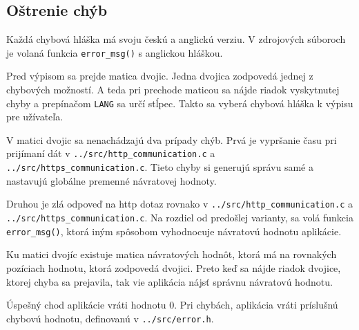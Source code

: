 \subsection*{Oštrenie chýb}
\label{err_label}
Každá chybová hláška má svoju českú a anglickú verziu. V zdrojových súboroch je volaná funkcia {\tt error\_msg()} s anglickou hláškou. 

Pred výpisom sa prejde matica dvojic. Jedna dvojica zodpovedá jednej z chybových možností. A teda pri prechode maticou sa nájde riadok vyskytnutej chyby a prepínačom {\tt LANG} sa určí stĺpec. Takto sa vyberá chybová hláška k výpisu pre užívateľa.

V matici dvojic sa nenachádzajú dva prípady chýb. Prvá je vypršanie času pri prijímaní dát v {\tt ../src/http\_communication.c} a 
\\{\tt ../src/https\_communication.c}. Tieto chyby si generujú správu samé a nastavujú globálne premenné návratovej hodnoty.

Druhou je zlá odpoveď na http dotaz rovnako v {\tt ../src/http\_communication.c} a 
\\{\tt ../src/https\_communication.c}. Na rozdiel od predošlej varianty, sa volá funkcia
\\{\tt error\_msg()}, ktorá iným spôsobom vyhodnocuje návratovú hodnotu aplikácie.

Ku matici dvojíc existuje matica návratových hodnôt, ktorá má na rovnakých pozíciach hodnotu, ktorá zodpovedá dvojici. Preto keď sa nájde riadok dvojice, ktorej chyba sa prejavila, tak vie aplikácia nájsť správnu návratovú hodnotu. 

Úspešný chod aplikácie vráti hodnotu 0. Pri chybách, aplikácia vráti príslušnú chybovú hodnotu, definovanú v {\tt ../src/error.h}.

